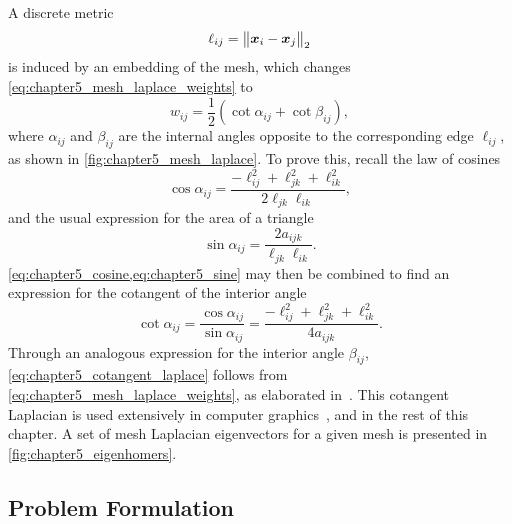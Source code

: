 A discrete metric
%
\begin{equation}
	\ell_{i j}
	= {\big\lVert\vb*{x}_{i} - \vb*{x}_{j}\big\rVert}_{2}
\end{equation}
%
is induced by an embedding of the mesh, which changes \cref{eq:chapter5_mesh_laplace_weights} to
%
\begin{equation}\label{eq:chapter5_cotangent_laplace}
	w_{i j}
	= \frac{1}{2}(\cot{\alpha_{i j}} + \cot{\beta_{i j}}),
\end{equation}
%
where \(\alpha_{i j}\) and \(\beta_{i j}\) are the internal angles opposite to the corresponding edge \(\ell_{i j}\), as shown in \cref{fig:chapter5_mesh_laplace}.
To prove this, recall the law of cosines
%
\begin{equation}\label{eq:chapter5_cosine}
	\cos{\alpha_{i j}}
	= \frac{-\ell_{i j}^{2} + \ell_{j k}^{2} + \ell_{i k}^{2}}{2\ell_{j k}\ell_{i k}},
\end{equation}
%
and the usual expression for the area of a triangle
%
\begin{equation}\label{eq:chapter5_sine}
	\sin{\alpha_{i j}}
	= \frac{2a_{i j k}}{\ell_{j k} \ell_{i k}}.
\end{equation}
%
\cref{eq:chapter5_cosine,eq:chapter5_sine} may then be combined to find an expression for the cotangent of the interior angle
%
\begin{equation}
	\cot{\alpha_{i j}}
	= \frac{\cos{\alpha_{i j}}}{\sin{\alpha_{i j}}}
	= \frac{-\ell_{i j}^{2} + \ell_{j k}^{2} + \ell_{i k}^{2}}{4a_{i j k}}.
\end{equation}
%
Through an analogous expression for the interior angle \(\beta_{i j}\), \cref{eq:chapter5_cotangent_laplace} follows from \cref{eq:chapter5_mesh_laplace_weights}, as elaborated in~\cite{Meyer2003}.
This cotangent Laplacian is used extensively in computer graphics~\cite{Pinkall1993}, and in the rest of this chapter.
A set of mesh Laplacian eigenvectors for a given mesh is presented in \cref{fig:chapter5_eigenhomers}.





\subsection{Problem Formulation}\label{sec:chapter5_problem_formulation}

